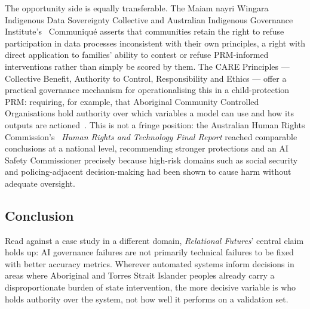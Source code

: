 The opportunity side is equally transferable. The Maiam nayri Wingara Indigenous Data Sovereignty
Collective and Australian Indigenous Governance Institute's~\cite{maiam2018communique}
Communiqu\'e asserts that communities retain the right to refuse participation in data processes
inconsistent with their own principles, a right with direct application to families' ability to
contest or refuse PRM-informed interventions rather than simply be scored by them. The CARE
Principles --- Collective Benefit, Authority to Control, Responsibility and Ethics --- offer a
practical governance mechanism for operationalising this in a child-protection PRM: requiring, for
example, that Aboriginal Community Controlled Organisations hold authority over which variables a
model can use and how its outputs are actioned~\cite{carroll2020care}. This is not a fringe
position: the Australian Human Rights Commission's~\cite{ahrc2021humanrights} \emph{Human Rights
and Technology Final Report} reached comparable conclusions at a national level, recommending
stronger protections and an AI Safety Commissioner precisely because high-risk domains such as
social security and policing-adjacent decision-making had been shown to cause harm without
adequate oversight.

\subsection{Conclusion}

Read against a case study in a different domain, \emph{Relational Futures}' central claim holds
up: AI governance failures are not primarily technical failures to be fixed with better accuracy
metrics. Wherever automated systems inform decisions in areas where Aboriginal and Torres Strait
Islander peoples already carry a disproportionate burden of state intervention, the more decisive
variable is who holds authority over the system, not how well it performs on a validation set.
